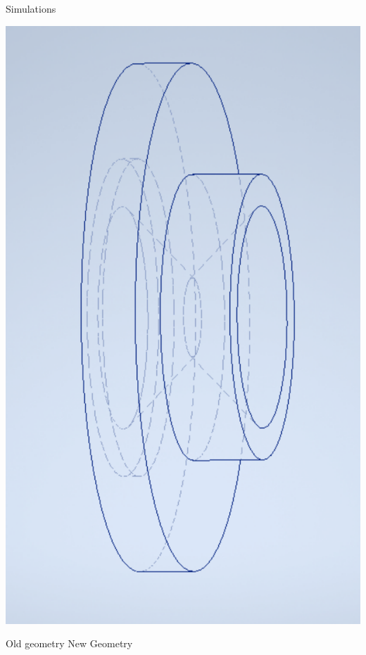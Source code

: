 \documentclass{beamer}
\begin{document}
\begin{frame}{Simulations}
\begin{center}
        \includegraphics[scale=0.2]{assets/newchamfer.pdf}
    \end{center}

    \begin{center}  
        Old geometry \hspace*{2em} New Geometry
    \end{center}
        
\end{frame}
\end{document}
